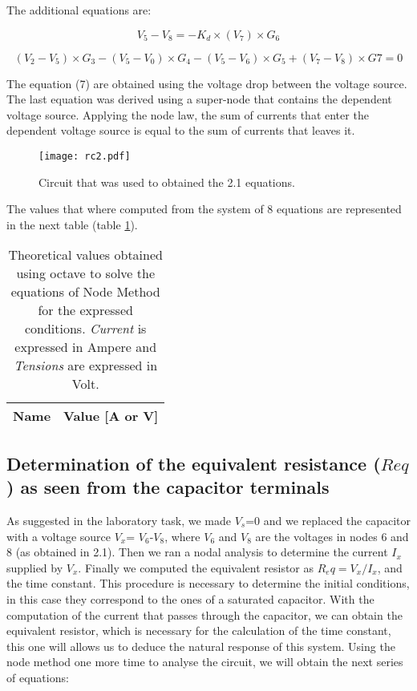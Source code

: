 The additional equations are:

\begin {equation}
V_5 - V_8 = -K_d\times (V_7)\times G_6
  \label {eq:kvl}
\end{equation}

\begin {equation}
(V_2 - V_5)\times G_3 - (V_5 - V_0)\times G_4 - (V_5 - V_6)\times G_5 + (V_7 - V_8)\times G7 = 0
  \label {eq:kvl}
\end{equation}

The equation (7) are obtained using the voltage drop between the voltage source. The last equation was derived using a super-node that contains the dependent voltage source. Applying the node law, the sum of currents that enter the dependent voltage source is equal to the sum of currents that leaves it. 

\begin{figure}[h] \centering
\texttt{[image: rc2.pdf]}
\caption{Circuit that was used to obtained the 2.1 equations.}
\label{fig:rc1}
\end{figure}

The values that where computed from the system of 8 equations are represented in the next table (table \ref{tab:NM}).


\begin{table}[h]
  \centering
  \begin{tabular}{|l|r|}
    \hline    
    {\bf Name} & {\bf Value [A or V]} \\ \hline
    
  \end{tabular}
  \caption{Theoretical values obtained using octave to solve the equations of Node Method for the expressed conditions. {\em Current}
    is expressed in Ampere and {\it Tensions} are expressed in
    Volt.}
  \label{tab:NM}
\end{table}


\newpage
\subsection{Determination of the equivalent resistance ($Req$) as seen from the capacitor terminals}

As suggested in the laboratory task, we made $V_s$=0 and we replaced the capacitor with a voltage source $V_x$= $V_6$-$V_8$, where $V_6$ and $V_8$ are the voltages in nodes 6 and 8 (as obtained in 2.1). Then we ran a nodal analysis to determine the current $I_x$ supplied by $V_x$. Finally we computed the equivalent resistor as $R_eq = V_x/I_x$, and the time constant.
This procedure is necessary to determine the initial conditions, in this case they correspond to the ones of a saturated capacitor. With the computation of the current that passes through the capacitor, we can obtain the equivalent resistor, which is necessary for the calculation of the time constant, this one will allows us to deduce the natural response of this system. 
Using the node method one more time to analyse the circuit, we will obtain the next series of equations:

